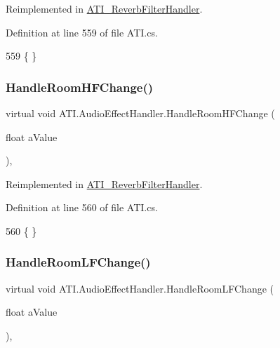 Reimplemented in \hyperlink{class_a_t_i___reverb_filter_handler_a2100456086ad1adf704bf88d71dbe490}{A\+T\+I\+\_\+\+Reverb\+Filter\+Handler}.



Definition at line 559 of file A\+T\+I.\+cs.


\begin{DoxyCode}
559 \{ \}
\end{DoxyCode}
\mbox{\label{class_a_t_i_1_1_audio_effect_handler_af3f3b123b89b6e53dce5a7c22190f5b6}} 
\subsubsection{\texorpdfstring{Handle\+Room\+H\+F\+Change()}{HandleRoomHFChange()}}
{\footnotesize\ttfamily virtual void A\+T\+I.\+Audio\+Effect\+Handler.\+Handle\+Room\+H\+F\+Change (\begin{DoxyParamCaption}\item[{float}]{a\+Value }\end{DoxyParamCaption})\hspace{0.3cm}{\ttfamily [protected]}, {\ttfamily [virtual]}}



Reimplemented in \hyperlink{class_a_t_i___reverb_filter_handler_a587ab9596231ed2ff9e3628bbc59d510}{A\+T\+I\+\_\+\+Reverb\+Filter\+Handler}.



Definition at line 560 of file A\+T\+I.\+cs.


\begin{DoxyCode}
560 \{ \}
\end{DoxyCode}
\mbox{\label{class_a_t_i_1_1_audio_effect_handler_ae2648d4ab8a617cbc509f7cfc38f21f6}} 
\subsubsection{\texorpdfstring{Handle\+Room\+L\+F\+Change()}{HandleRoomLFChange()}}
{\footnotesize\ttfamily virtual void A\+T\+I.\+Audio\+Effect\+Handler.\+Handle\+Room\+L\+F\+Change (\begin{DoxyParamCaption}\item[{float}]{a\+Value }\end{DoxyParamCaption})\hspace{0.3cm}{\ttfamily [protected]}, {\ttfamily [virtual]}}



